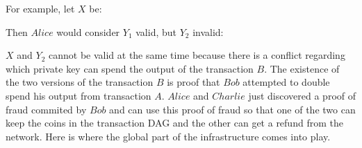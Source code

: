   For example, let $X$ be:
  \begin{center}
    \begin{dot2tex}[outputdir=dot2tex/, file=basedag]
      
    \end{dot2tex}
  \end{center}
  Then $Alice$ would consider $Y_1$ valid, but $Y_2$ invalid:
  \begin{center}
    \begin{dot2tex}[outputdir=dot2tex/, file=gooddag]
      
    \end{dot2tex}
  \end{center}
  \begin{center}
    \begin{dot2tex}[outputdir=dot2tex/, file=baddag]
      
    \end{dot2tex}
  \end{center}
  $X$ and $Y_2$ cannot be valid at the same time because there is a conflict regarding
  which private key can spend the output of the transaction $B$. The existence of the two
  versions of the transaction $B$ is proof that $Bob$ attempted to double spend his output
  from transaction $A$. $Alice$ and $Charlie$ just discovered a proof of fraud commited by
  $Bob$ and can use this proof of fraud so that one of the two can keep the coins in the
  transaction DAG and the other can get a refund from the network. Here is where the
  global part of the infrastructure comes into play.
